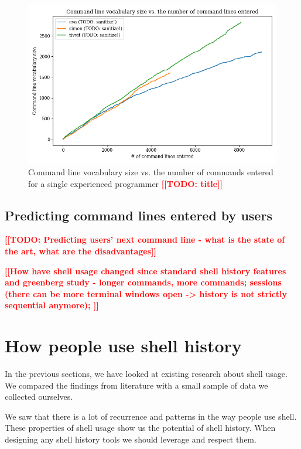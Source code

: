 \documentclass[thesis=M,english]{FITthesis}[2012/10/20]
\newcommand{\blind}[1][1]{}
\newcommand{\todotext}[1]{\textcolor{red}{\textbf{[[#1]]}}}
\newcommand{\tmpframe}[1]{\fbox{#1}}
\renewcommand{\tmpframe}[1]{#1}
\begin{document}
\begin{figure}
  \tmpframe{\includegraphics[width=\linewidth]{figures/greenberg_new/plot_cmdline-vocab-size.png}}
  \caption{Command line vocabulary size vs. the number of commands
entered for a single experienced programmer \todotext{TODO: title}}
\end{figure}

\subsection{Predicting command lines entered by users}
\todotext{TODO: Predicting users' next command line - what is the state of the art, what are the disadvantages}

\blind[2]


\todotext{How have shell usage changed since standard shell history features and greenberg study - longer commands, more commands; sessions (there can be more terminal windows open -> history is not strictly sequential anymore); }



\blind[3]


\section{How people use shell history}


In the previous sections, we have looked at existing research about shell usage. We compared the findings from literature with a small sample of data we collected ourselves. 

We saw that there is a lot of recurrence and patterns in the way people use shell. These properties of shell usage show us the potential of shell history. When designing any shell history tools we should leverage and respect them.
\end{document}
